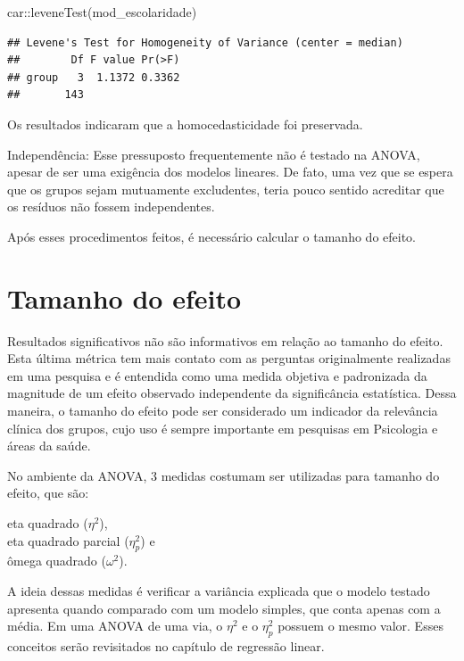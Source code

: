 \documentclass[
]{book}
\newenvironment{Shaded}{\begin{snugshade}}{\end{snugshade}}
\newcommand{\FunctionTok}[1]{\textcolor[rgb]{0.00,0.00,0.00}{#1}}
\newcommand{\NormalTok}[1]{#1}
\newcommand{\SpecialCharTok}[1]{\textcolor[rgb]{0.00,0.00,0.00}{#1}}
\begin{document}
\begin{Shaded}
\begin{Highlighting}[]
\NormalTok{car}\SpecialCharTok{::}\FunctionTok{leveneTest}\NormalTok{(mod\_escolaridade)}
\end{Highlighting}
\end{Shaded}

\begin{verbatim}
## Levene's Test for Homogeneity of Variance (center = median)
##        Df F value Pr(>F)
## group   3  1.1372 0.3362
##       143
\end{verbatim}

Os resultados indicaram que a homocedasticidade foi preservada.

Independência: Esse pressuposto frequentemente não é testado na ANOVA, apesar de ser uma exigência dos modelos lineares. De fato, uma vez que se espera que os grupos sejam mutuamente excludentes, teria pouco sentido acreditar que os resíduos não fossem independentes.

Após esses procedimentos feitos, é necessário calcular o tamanho do efeito.

\hypertarget{tamanho-do-efeito-3}{%
\section{Tamanho do efeito}\label{tamanho-do-efeito-3}}

Resultados significativos não são informativos em relação ao tamanho do efeito. Esta última métrica tem mais contato com as perguntas originalmente realizadas em uma pesquisa e é entendida como uma medida objetiva e padronizada da magnitude de um efeito observado independente da significância estatística. Dessa maneira, o tamanho do efeito pode ser considerado um indicador da relevância clínica dos grupos, cujo uso é sempre importante em pesquisas em Psicologia e áreas da saúde.

No ambiente da ANOVA, 3 medidas costumam ser utilizadas para tamanho do efeito, que são:

eta quadrado (\(\eta^2\)),\\
eta quadrado parcial (\(\eta_p^2\)) e\\
ômega quadrado (\(\omega^2\)).

A ideia dessas medidas é verificar a variância explicada que o modelo testado apresenta quando comparado com um modelo simples, que conta apenas com a média. Em uma ANOVA de uma via, o \(\eta^2\) e o \(\eta_p^2\) possuem o mesmo valor. Esses conceitos serão revisitados no capítulo de regressão linear.
\end{document}
